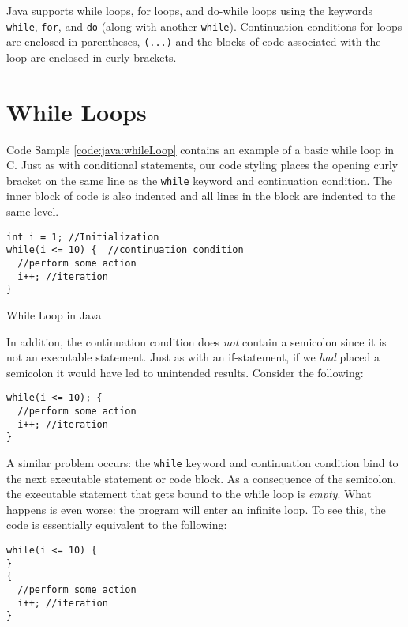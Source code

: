 

Java supports while loops, for loops, and do-while loops using the keywords
\texttt{while}, \texttt{for}, and \texttt{do} (along with 
another \texttt{while}).  Continuation conditions for loops are 
enclosed in parentheses, \texttt{(...)} and the blocks of code
associated with the loop are enclosed in curly brackets.  

\section{While Loops}

Code Sample \ref{code:java:whileLoop} contains an example of a basic
while loop in C.  Just as with conditional statements, our code styling
places the opening curly bracket on the same line as the \texttt{while}
keyword and continuation condition.  The inner block of code is also
indented and all lines in the block are indented to the same level.

\begin{listing}
\begin{verbatim}
int i = 1; //Initialization
while(i <= 10) {  //continuation condition
  //perform some action
  i++; //iteration
}
\end{verbatim}
  \caption{While Loop in Java}
  \label{code:java:whileLoop}
\end{listing}

In addition, the continuation condition does \emph{not} contain 
a semicolon since it is not an executable statement.  Just as with
an if-statement, if we \emph{had} placed a semicolon it would 
have led to unintended results.  Consider the following:

\begin{verbatim}
while(i <= 10); {
  //perform some action
  i++; //iteration
}
\end{verbatim}

A similar problem occurs: the \texttt{while} keyword and
continuation condition bind to the next executable statement or
code block.  As a consequence of the semicolon, the executable
statement that gets bound to the while loop is \emph{empty}.  What
happens is even worse: the program will enter an infinite loop.  To
see this, the code is essentially equivalent to the following:

\begin{verbatim}
while(i <= 10) {
}
{
  //perform some action
  i++; //iteration
}
\end{verbatim}

